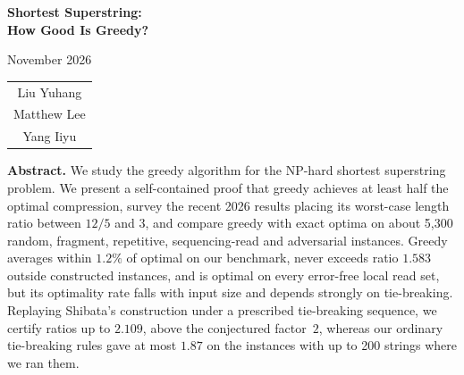 \documentclass[11pt,a4paper]{article}   %
\theoremstyle{compact}
\theoremstyle{compactdef}
\begin{document}
\begin{titlepage}
  \centering
  \vspace*{0.22\textheight}
  {\Huge\bfseries Shortest Superstring:\\[0.6ex] How Good Is Greedy?\par}
  \vspace{2.5em}

  {\large November 2026\par}
  \vspace*{2.5em}
  {\large
  \begin{tabular}{c}
    Liu Yuhang  \\
    Matthew Lee  \\
    Yang Iiyu  \\

  \end{tabular}\par}
  \vfill
  \vspace{3em}
  \begin{minipage}{0.8\textwidth}
    \small\textbf{Abstract.}
    We study the greedy algorithm for the NP-hard shortest superstring
    problem. We present a self-contained proof that greedy achieves at
    least half the optimal compression, survey the recent 2026 results
    placing its worst-case length ratio between $12/5$ and $3$, and
    compare greedy with exact optima on about 5{,}300 random, fragment,
    repetitive, sequencing-read and adversarial instances. Greedy averages
    within $1.2\%$ of optimal on our benchmark, never exceeds ratio $1.583$
    outside constructed instances, and is optimal on every error-free local
    read set, but its optimality rate falls with input size and depends
    strongly on tie-breaking. Replaying Shibata's construction under a
    prescribed tie-breaking sequence, we certify ratios up to $2.109$, above
    the conjectured factor~$2$, whereas our ordinary tie-breaking rules gave
    at most $1.87$ on the instances with up to 200 strings where we ran them.
  \end{minipage}
  
\end{titlepage}

\end{document}
